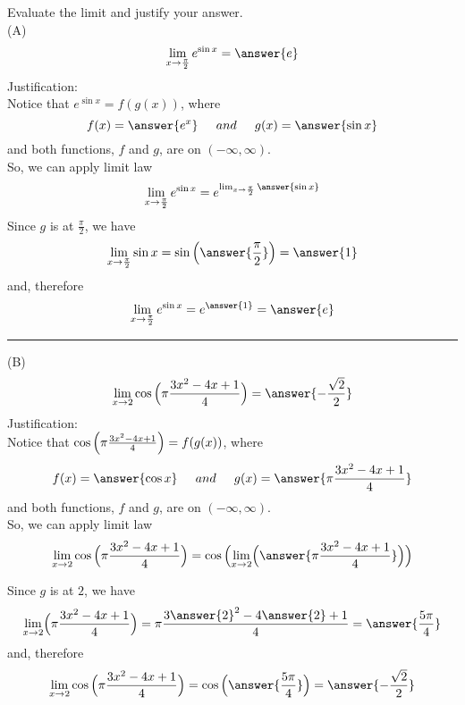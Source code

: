 \documentclass{ximera}
\author{Nela Lakos}
\begin{document}
\begin{exercise}
Evaluate the limit and justify your answer.\\
(A) 
 \[
\lim_{x\to \frac{\pi}{2}}e^{\sin{x}} =\answer{e}  
\] 
Justification:\\[1em]
Notice that $e^{\sin{x}} =f(g(x)) $, where
\[
 f(x)=\answer{e^{x}} \hspace{0.2in}and \hspace{0.2in} g(x)=\answer{\sin{x}}
\] 
and both functions, $f$ and $g$,  are   on $ (-\infty,\infty)$.\\
So, we can apply
  limit law 
 \[
\lim_{x\to \frac{\pi}{2}}e^{\sin{x}} = e^{\lim_{x\to \frac{\pi}{2}}\answer{\sin{x}}}
\] 
Since $g$ is   at $\frac{\pi}{2}$, we have
 \[
\lim_{x\to \frac{\pi}{2}}\sin{x}=\sin{\Bigl(\answer{\frac{\pi}{2}}\Bigr)}=\answer{1}
\] 
and, therefore
\[
\lim_{x\to \frac{\pi}{2}}e^{\sin{x}} =e^{\answer{1}}  =\answer{e}
\] 
\noindent\rule[0.5ex]{\linewidth}{.2pt}

(B)
 \[
\lim_{x\to2}\cos{\Bigl(\pi\frac{3x^{2}-4x+1}{4}\Bigr)} = \answer{-\frac{\sqrt{2}}{2}}
\] 
Justification:\\ 
Notice that $\cos{\Bigl(\pi\frac{3x^{2}-4x+1}{4}\Bigr)}=f(g(x)) $, where
\[
 f(x)=\answer{\cos{x}} \hspace{0.2in}and \hspace{0.2in} g(x)=\answer{\pi\frac{3x^{2}-4x+1}{4}}
\] 
and both functions, $f$ and $g$,  are   on $ (-\infty,\infty)$.\\
So, we can apply
  limit law 
 \[
\lim_{x\to2}\cos{\Bigl(\pi\frac{3x^{2}-4x+1}{4}\Bigr)}  =\cos{\Bigl(\lim_{x\to2}\Bigl(\answer{\pi\frac{3x^{2}-4x+1}{4}}\Bigr)\Bigr)} 
\] 

Since $g$ is   at $2$, we have
 \[
\lim_{x\to2}\Bigl(\pi\frac{3x^{2}-4x+1}{4}\Bigr)=\pi\frac{3\answer{2}^{2}-4\answer{2}+1}{4}=\answer{\frac{5\pi}{4}}
\]
and, therefore
\[
\lim_{x\to2}\cos{\Bigl(\pi\frac{3x^{2}-4x+1}{4}\Bigr)} =\cos{\Bigl(\answer{\frac{5\pi}{4}} \Bigr)}= \answer{-\frac{\sqrt{2}}{2}}
\] 


\end{exercise}
\end{document}
